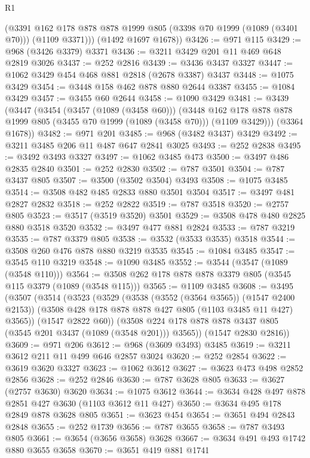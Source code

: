 \begin{lexlean}{R1}
\begin{coremodule}
        (@3391 @162 @178 @878 @878 @1999 @805 (@3398 @70 @1999 (@1089 (@3401 @70))) (@1109 @3371)))
      (@1492 @1697 @1678))
@3426 := @971 @115
@3429 := @968 (@3426 @3379) @3371
@3436 := @3211 @3429 @201 @11 @469 @648 @2819 @3026
@3437 := @252 @2816
@3439 := @3436 @3437 @3327
@3447 := @1062 @3429 @454 @468 @881 @2818 (@2678 @3387) @3437
@3448 := @1075 @3429
@3454 := @3448 @158 @462 @878 @880 @2644 @3387
@3455 := @1084 @3429
@3457 := @3455 @60 @2644
@3458 := @1090 @3429
@3481 := @3439
    (@3447
      (@3454
        (@3457 (@1089 (@3458 @60)))
        (@3448 @162 @178 @878 @878 @1999 @805 (@3455 @70 @1999 (@1089 (@3458 @70))) (@1109 @3429)))
      (@3364 @1678))
@3482 := @971 @201
@3485 := @968 (@3482 @3437) @3429
@3492 := @3211 @3485 @206 @11 @487 @647 @2841 @3025
@3493 := @252 @2838
@3495 := @3492 @3493 @3327
@3497 := @1062 @3485 @473
@3500 := @3497 @486 @2835 @2840
@3501 := @252 @2830
@3502 := @787 @3501
@3504 := @787 @3437 @805
@3507 := @3500 (@3502 @3504) @3493
@3508 := @1075 @3485
@3514 := @3508 @482 @485 @2833 @880 @3501 @3504
@3517 := @3497 @481 @2827 @2832
@3518 := @252 @2822
@3519 := @787 @3518
@3520 := @2757 @805
@3523 := @3517 (@3519 @3520) @3501
@3529 := @3508 @478 @480 @2825 @880 @3518 @3520
@3532 := @3497 @477 @881 @2824
@3533 := @787 @3219
@3535 := @787 @3379 @805
@3538 := @3532 (@3533 @3535) @3518
@3544 := @3508 @260 @476 @878 @880 @3219 @3535
@3545 := @1084 @3485
@3547 := @3545 @110 @3219
@3548 := @1090 @3485
@3552 := @3544 (@3547 (@1089 (@3548 @110)))
@3564 := @3508 @262 @178 @878 @878 @3379 @805 (@3545 @115 @3379 (@1089 (@3548 @115)))
@3565 := @1109 @3485
@3608 := @3495
    (@3507
      (@3514
        (@3523
          (@3529
            (@3538 (@3552 (@3564 @3565)) (@1547 @2400 @2153))
            (@3508 @428 @178 @878 @878 @427 @805 (@1103 @3485 @11 @427) @3565))
          (@1547 @2822 @60))
        (@3508 @224 @178 @878 @878 @3437 @805 (@3545 @201 @3437 (@1089 (@3548 @201))) @3565))
      (@1547 @2830 @2816))
@3609 := @971 @206
@3612 := @968 (@3609 @3493) @3485
@3619 := @3211 @3612 @211 @11 @499 @646 @2857 @3024
@3620 := @252 @2854
@3622 := @3619 @3620 @3327
@3623 := @1062 @3612
@3627 := @3623 @473 @498 @2852 @2856
@3628 := @252 @2846
@3630 := @787 @3628 @805
@3633 := @3627 (@2757 @3630) @3620
@3634 := @1075 @3612
@3644 := @3634 @428 @497 @878 @2851 @427 @3630 (@1103 @3612 @11 @427)
@3650 := @3634 @495 @178 @2849 @878 @3628 @805
@3651 := @3623 @454
@3654 := @3651 @494 @2843 @2848
@3655 := @252 @1739
@3656 := @787 @3655
@3658 := @787 @3493 @805
@3661 := @3654 (@3656 @3658) @3628
@3667 := @3634 @491 @493 @1742 @880 @3655 @3658
@3670 := @3651 @419 @881 @1741

\end{coremodule}
\end{lexlean}
